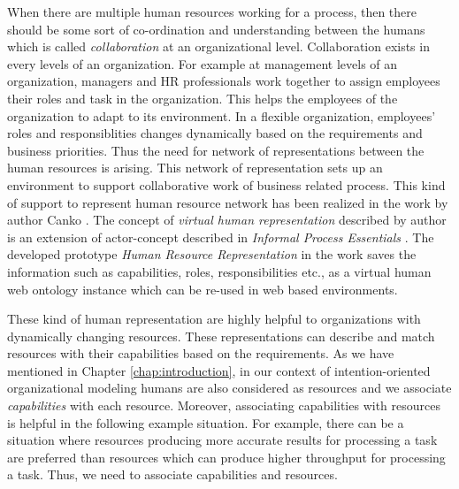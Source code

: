 When there are multiple human resources working for a process, then there should be some sort of co-ordination and understanding between the humans which is called \textit{collaboration} at an organizational level. Collaboration exists in every levels of an organization. For example at management levels of an organization, managers and HR professionals work together to assign employees their roles and task in the organization. This helps the employees of the organization to adapt to its environment. In a flexible organization, employees' roles and responsiblities changes dynamically based on the requirements and business priorities. Thus the need for network of representations between the human resources is arising. This network of representation sets up an environment to support collaborative work of business related process. This kind of support to represent human resource network has been realized in the work by author Canko \cite{Canko2015}. The concept of \textit{virtual human representation} described by author is an extension of actor-concept described in \textit{Informal Process Essentials} \cite{Sungur2014a}. The developed prototype \textit{Human Resource Representation} in the work \cite{Canko2015} saves the information such as capabilities, roles, responsibilities etc., as a virtual human web ontology instance which can be re-used in web based environments.

These kind of human representation are highly helpful to organizations with dynamically changing resources. These representations can describe and match resources with their capabilities based on the requirements. As we have mentioned in Chapter \ref{chap:introduction}, in our context of intention-oriented organizational modeling humans are also considered as resources and we associate \textit{capabilities} with each resource. Moreover, associating capabilities with resources is helpful in the following example situation. For example, there can be a situation where resources producing more accurate results for processing a task are preferred than resources which can produce higher throughput for processing a task. Thus, we need to associate capabilities and resources. 

 
